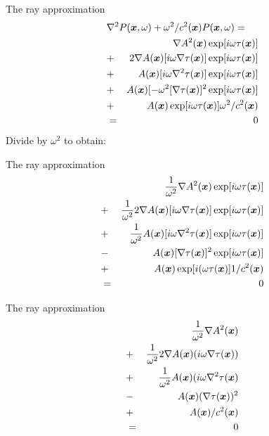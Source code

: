 \documentclass[xcolor=dvipsnames,notes]{beamer}
\begin{document}
\begin{frame}{The ray approximation}
\begin{eqnarray}
\lefteqn{\nabla^2 P(\xx,\omega) +\omega^2/c^2(\xx)P(\xx,\omega)  = }& &  \\
                             &   & \nabla A^2(\xx)\exp[i\omega\tau(\xx)] \nonumber\\
                             & + & 2\nabla A(\xx)[i\omega\nabla\tau(\xx)]\exp[i\omega\tau(\xx)] \nonumber\\
			     & + & A(\xx)[i\omega\nabla^2\tau(\xx)]\exp[i\omega\tau(\xx)] \nonumber\\      
			     & + & A(\xx)[-\omega^2[\nabla\tau(\xx)]^2\exp[i\omega\tau(\xx)]\nonumber\\
			     & + & A(\xx)\exp[i\omega\tau(\xx)]\omega^2/c^2(\xx)\nonumber\\
                             & = & 0
\end{eqnarray}
Divide by $\omega^2$ to obtain:
\end{frame}
\begin{frame}{The ray approximation}
\begin{eqnarray}
                             & &\frac{1}{\omega^2}\nabla A^2(\mbox{\boldmath $x$})\exp[i\omega\tau(\mbox{\boldmath $x$})] \nonumber\\
                             & + & \frac{1}{\omega^2}2\nabla A(\mbox{\boldmath $x$})[i\omega\nabla\tau(\mbox{\boldmath $x$})]\exp[i\omega\tau(\mbox{\boldmath $x$})] \nonumber\\
			     & + & \frac{1}{\omega^2}A(\mbox{\boldmath $x$})[i\omega\nabla^2\tau(\mbox{\boldmath $x$})]\exp[i\omega\tau(\mbox{\boldmath $x$})] \nonumber\\      
                             & - & A(\mbox{\boldmath $x$})[\nabla\tau(\mbox{\boldmath $x$})]^2\exp[i\omega\tau(\mbox{\boldmath $x$})]\nonumber\\
                             & + & A(\mbox{\boldmath $x$})\exp[i(\omega\tau(\mbox{\boldmath $x$})]1/c^2(\mbox{\boldmath $x$})\nonumber\\
                             & = & 0
\end{eqnarray}
\end{frame}
\begin{frame}{The ray approximation}
\begin{eqnarray}
                             & &\frac{1}{\omega^2}\nabla A^2(\mbox{\boldmath $x$}) \nonumber\\
                             & + & \frac{1}{\omega^2}2\nabla A(\mbox{\boldmath $x$})(i\omega\nabla\tau(\mbox{\boldmath $x$})) \nonumber\\
                             & + & \frac{1}{\omega^2}A(\mbox{\boldmath $x$})(i\omega\nabla^2\tau(\mbox{\boldmath $x$})\nonumber\\      
                             & - & A(\mbox{\boldmath $x$})(\nabla\tau(\mbox{\boldmath $x$}))^2\nonumber\\
                             & + & A(\mbox{\boldmath $x$})/c^2(\mbox{\boldmath $x$})\nonumber\\
                             & = & 0
\end{eqnarray}
\end{frame}
\end{document}
